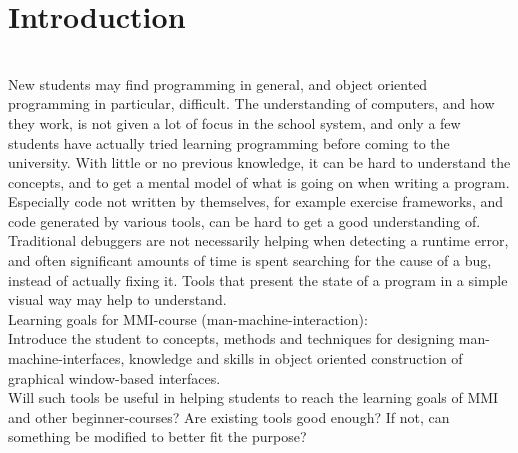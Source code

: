 \section{Introduction}\label{introduction}
~\\
New students may find programming in general, and object oriented programming in particular, difficult.
The understanding of computers, and how they work, is not given a lot of focus in the school system, and only a few students have actually tried learning programming before coming to the university.
With little or no previous knowledge, it can be hard to understand the concepts, and to get a mental model of what is going on when writing a program.
Especially code not written by themselves, for example exercise frameworks, and code generated by various tools, can be hard to get a good understanding of.
Traditional debuggers are not necessarily helping when detecting a runtime error, and often significant amounts of time is spent searching for the cause of a bug, instead of actually fixing it\cite{ko2006}.
Tools that present the state of a program in a simple visual way may help to understand.
~\\

Learning goals for MMI-course (man-machine-interaction):\\
Introduce the student to concepts, methods and techniques for designing man-machine-interfaces, knowledge and skills in object oriented construction of graphical window-based interfaces.
~\\

Will such tools be useful in helping students to reach the learning goals of MMI and other beginner-courses?
Are existing tools good enough?
If not, can something be modified to better fit the purpose?